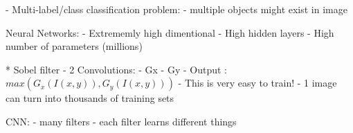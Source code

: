 - Multi-label/class classification problem:
 - multiple objects might exist in image

Neural Networks:
- Extrememly high dimentional
- High hidden layers
- High number of parameters (millions)

* Sobel filter
- 2 Convolutions:
 - Gx
 - Gy
 - Output : $max(G_x(I(x,y)),G_y(I(x,y)))$
- This is very easy to train!
- 1 image can turn into thousands of training sets

CNN:
- many filters
- each filter learns different things
